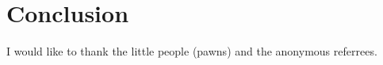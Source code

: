 \documentclass[twocolumn]{amsart}
\begin{document}
\section{Conclusion}
% 

I would like to thank the little people (pawns) and the anonymous
referrees.

% 
% 
% 
% 
% 
% 

{}

\end{document}
